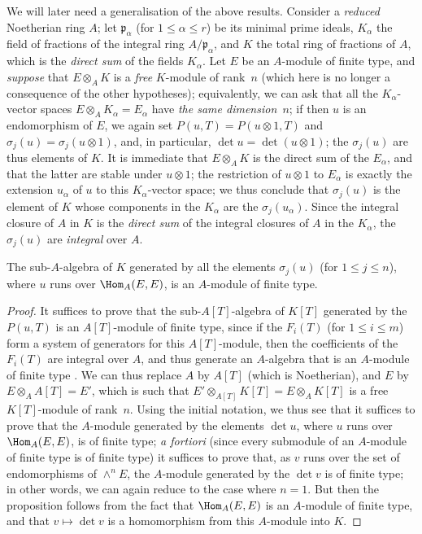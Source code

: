 \begin{remark}[6.4.7]
\label{II.6.4.7}
We will later need a generalisation of the above results.
Consider a \emph{reduced} Noetherian ring $A$;
let $\mathfrak{p}_\alpha$ (for $1\leq\alpha\leq r$) be its minimal prime ideals, $K_\alpha$ the field of fractions of the integral ring $A/\mathfrak{p}_\alpha$, and $K$ the total ring of fractions of $A$, which is the \emph{direct sum} of the fields $K_\alpha$.
Let $E$ be an $A$-module of finite type, and \emph{suppose} that $E\otimes_A K$ is a \emph{free} $K$-module of rank~$n$ (which here is no longer a consequence of the other hypotheses);
equivalently, we can ask that all the $K_\alpha$-vector spaces $E\otimes_A K_\alpha=E_\alpha$ have \emph{the same dimension~$n$};
if then $u$ is an endomorphism of $E$, we again set $P(u,T)=P(u\otimes1,T)$ and $\sigma_j(u)=\sigma_j(u\otimes1)$, and, in particular, $\det u=\det(u\otimes1)$;
the $\sigma_j(u)$ are thus elements of $K$.
It is immediate that $E\otimes_A K$ is the direct sum of the $E_\alpha$, and that the latter are stable under $u\otimes1$;
the restriction of $u\otimes1$ to $E_\alpha$ is exactly the extension $u_\alpha$ of $u$ to this $K_\alpha$-vector space;
we thus conclude that $\sigma_j(u)$ is the element of $K$ whose components in the $K_\alpha$ are the $\sigma_j(u_\alpha)$.
Since the integral closure of $A$ in $K$ is the \emph{direct sum} of the integral closures of $A$ in the $K_\alpha$, the $\sigma_j(u)$ are \emph{integral} over $A$.

\begin{lemma}[6.4.7.1]
\label{II.6.4.7.1}
The sub-$A$-algebra of $K$ generated by all the elements $\sigma_j(u)$ (for $1\leq j\leq n$), where $u$ runs over $\Hom_A(E,E)$, is an $A$-module of finite type.
\end{lemma}

\begin{proof}
It suffices to prove that the sub-$A[T]$-algebra of $K[T]$ generated by the $P(u,T)$ is an $A[T]$-module of finite type, since if the $F_i(T)$ (for $1\leq i\leq m$) form a system of generators for this $A[T]$-module, then the coefficients of the $F_i(T)$ are integral over $A$, and thus generate an $A$-algebra that is an $A$-module of finite type \cite[t.~I, p.~255, th.~1]{I-13}.
We can thus replace $A$ by $A[T]$ (which is Noetherian), and $E$ by $E\otimes_A A[T]=E'$, which is such that $E'\otimes_{A[T]}K[T]=E\otimes_A K[T]$ is a free $K[T]$-module of rank~$n$.
Using the initial notation, we thus see that it suffices to prove that the $A$-module generated by the elements $\det u$, where $u$ runs over $\Hom_A(E,E)$, is of finite type;
\emph{a fortiori} (since every submodule of an $A$-module of finite type is of finite type) it suffices to prove that, as $v$ runs over the set of endomorphisms of $\wedge^n E$, the $A$-module generated by the $\det v$ is of finite type;
in other words, we can again reduce to the case where $n=1$.
But then the proposition follows from the fact that $\Hom_A(E,E)$ is an $A$-module of finite type, and that $v\mapsto\det v$ is a homomorphism from this $A$-module into $K$.
\end{proof}


\end{remark}
